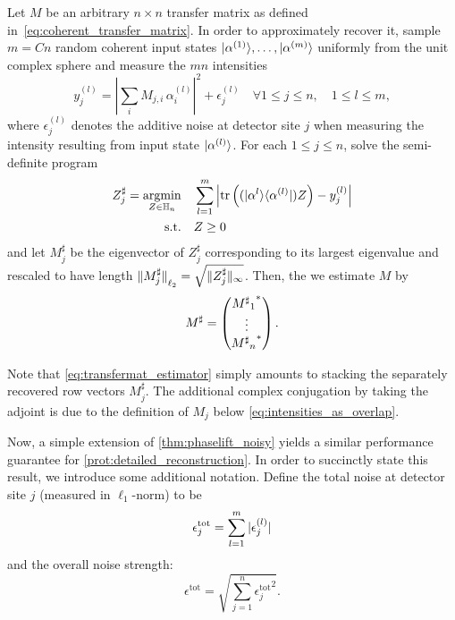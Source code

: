 \begin{protocol}%
  \label{prot:detailed_reconstruction}
  Let ${M}$ be an arbitrary $n \times n$ transfer matrix as defined in~\eqref{eq:coherent_transfer_matrix}.
  In order to approximately recover it, sample $m = Cn$ random coherent input states $\ket{{\alpha}^{(1)}},\ldots,\ket{{\alpha}^{(m)}}$ uniformly from the unit complex sphere and measure the $mn$ intensities
  \[
    y_j^{(l)} = \left| \sum_i M_{j,i} \, \alpha_i^{(l)} \right|^2 + \epsilon_j^{(l)} \quad \forall 1 \leq j \leq n, \quad 1 \leq l \leq m,
  \]
  where $\epsilon_j^{(l)}$ denotes the additive noise at detector site $j$ when measuring the intensity resulting from input state  $\ket{{\alpha}^{(l)}}$.
  For each $1 \leq j \leq n$, solve the semi-definite program
  \begin{align}
    {Z}^\sharp_{j} = \underset{{Z} \in \mathbb{H}_n}{\operatorname{argmin}}& \quad \sum_{l=1}^m \left| \operatorname{tr} \left( (|{\alpha}^{l} \rangle \langle {\alpha}^{(l)} | )  Z \right) - y_j^{(l)} \right| \label{eq:tmat_recovery_program}\\
    \mathrm{s.t.} & \quad {Z} \geq 0 \nonumber
  \end{align}
  and let ${M}_j^\sharp$ be the eigenvector of ${Z}^\sharp_{j}$ corresponding to its largest eigenvalue and rescaled to have length ${\Vert{M}_j^\sharp\Vert}_{\ell_2} = \sqrt{ \| {Z}^\sharp_{j} \|_\infty}$.
  Then, the we estimate ${M}$ by
  \[
    {M}^\sharp =
    \begin{pmatrix}
      {{{M^\sharp}_1}^\ast} \\ \vdots \\  {{{M^\sharp}_n}^\ast}
    \end{pmatrix}.
    \label{eq:transfermat_estimator}
  \]
\end{protocol}
Note that \cref{eq:transfermat_estimator} simply amounts to stacking the separately recovered row vectors $ M_j^\sharp$.
The additional complex conjugation by taking the adjoint is due to the definition of $ M_j$ below \cref{eq:intensities_as_overlap}.

Now, a simple extension of \cref{thm:phaselift_noisy} yields a similar performance guarantee for \cref{prot:detailed_reconstruction}.
In order to succinctly state this result, we introduce some additional notation.
Define the total noise at detector site $j$ (measured in $\ell_1$-norm) to be
\[
  \epsilon_j^{\mathrm{tot}}= \sum_{l=1}^m {\vert\epsilon_j^{(l)}\vert}
\]
and the overall noise strength:
\[
  \epsilon^{\mathrm{tot}} = \sqrt{ \sum_{j=1}^n {\epsilon_j^{\mathrm{tot}}}^2}.
\]


